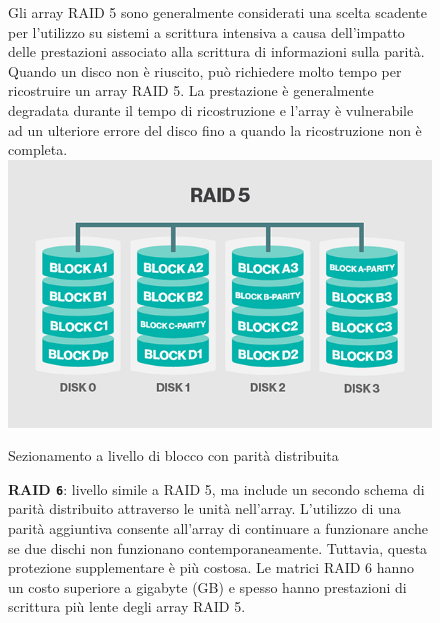 \begin{itemize}
\begin{figure}[htbp]
Gli array RAID 5 sono generalmente considerati una scelta scadente per l'utilizzo su sistemi a scrittura intensiva a causa dell'impatto delle prestazioni associato alla scrittura di informazioni sulla parit\`{a}. Quando un disco non \`{e} riuscito, pu\`{o} richiedere molto tempo per ricostruire un array RAID 5. La prestazione \`{e} generalmente degradata durante il tempo di ricostruzione e l'array \`{e} vulnerabile ad un ulteriore errore del disco fino a quando la ricostruzione non \`{e} completa.\cite{etichetta9}\\

\centering
\includegraphics[scale=0.40]{img/raid55.png}\\
\caption{Sezionamento a livello di blocco con parit\`{a} distribuita\label{figura1.9} \cite{etichetta9}}
\end{figure}

\begin{figure}[htbp]
\item
\textbf{RAID \verb"6"}: livello simile a RAID 5, ma include un secondo schema di parit\`{a} distribuito attraverso le unit\`{a} nell'array. L'utilizzo di una parit\`{a} aggiuntiva consente all'array di continuare a funzionare anche se due dischi non funzionano contemporaneamente. Tuttavia, questa protezione supplementare \`{e} pi\`{u} costosa. Le matrici RAID 6 hanno un costo superiore a gigabyte (GB) e spesso hanno prestazioni di scrittura pi\`{u} lente degli array RAID 5.\cite{etichetta9}\\


\end{figure}
\end{itemize}
